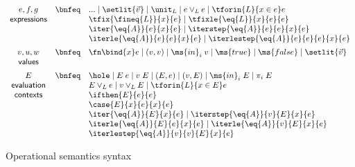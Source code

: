 \begin{figure}
  \[\begin{array}{ccl}
    e,f,g
    &\bnfeq& ... \pipe \setlit{\vec{v}} \pipe \unit_L \pipe e \vee_L e \pipe \tforin{L}{x \in e} e\\
    \textsf{expressions}
    && \tfix{\fineq{L}}{x}{e} \pipe \tfixle{\eq{L}}{x}{e}{e}\\
    && \iter{\eq{A}}{e}{x}{e} \pipe \iterstep{\eq{A}}{e}{e}{x}{e}\\
    && \iterle{\eq{A}}{e}{e}{x}{e} \pipe \iterlestep{\eq{A}}{e}{e}{e}{x}{e}
    \vspace{0.5em}\\
    v,u,w
    &\bnfeq& \fn\bind{x} e \pipe (v, v) \pipe \ms{in}_i\; v
    \pipe \ms{true} \pipe \ms{false} \pipe \setlit{\vec{v}}\\
    \textsf{values}
    \vspace{0.5em}\\
    E
    &\bnfeq& \hole \pipe E\;e \pipe v\;E \pipe (E, e) \pipe (v, E) \pipe \ms{in}_i\;E
    \pipe \pi_i \; E\\
    \textsf{evaluation}
    && E \vee_L e \pipe v \vee_L E \pipe \tforin{L}{x \in E} e\\
    \textsf{contexts}
    && \ifthen{E}{e}{e}\\
    && \case{E}{x}{e}{x}{e}\\
    && \iter{\eq{A}}{E}{x}{e} \pipe \iterstep{\eq{A}}{v}{E}{x}{e}\\
    && \iterle{\eq{A}}{E}{e}{x}{e} \pipe \iterle{\eq{A}}{v}{E}{x}{e}\\
    && \iterlestep{\eq{A}}{v}{v}{E}{x}{e}
  \end{array}\]
  \caption{Operational semantics syntax}
  \label{fig:opsem-syntax}
\end{figure}

